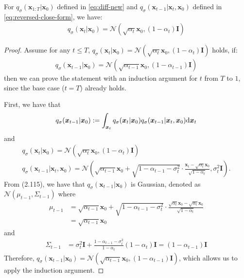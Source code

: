 \begin{lemma}
\label{lemma:reverse-process-consistency}
For $q_\sigma(\bm{x}_{1:T} | \bm{x}_0)$ defined in \eqref{eq:diff-new} and $q_\sigma(\bm{x}_{t-1} | \bm{x}_t, \bm{x}_0)$ defined in \eqref{eq:reversed-close-form}, we have:
\begin{align}
q_\sigma(\bm{x}_{t} | \bm{x}_0) = \mathcal{N}(\sqrt{\alpha_t} \bm{x}_0, (1 - \alpha_t) \bm{I})
\end{align}
\end{lemma}
\begin{proof}
Assume for any $t \leq T$, $q_\sigma(\bm{x}_{t} | \bm{x}_0) = \mathcal{N}(\sqrt{\alpha_t} \bm{x}_0, (1 - \alpha_t) \bm{I})$ holds, if:
\begin{align}
    q_\sigma(\bm{x}_{t-1} | \bm{x}_0) = \mathcal{N}(\sqrt{\alpha_{t-1}} \bm{x}_0, (1 - \alpha_{t-1}) \bm{I})
\end{align}
then we can prove the statement with an induction argument for $t$ from $T$ to $1$, since the base case ($t = T$) already holds.

First, we have that
$$
    q_\sigma(\bm{x}_{t-1} | \bm{x}_0) := \int_{\bm{x}_t} q_\sigma(\bm{x}_{t} | \bm{x}_0) q_\sigma(\bm{x}_{t-1} | \bm{x}_t, \bm{x}_0) \mathrm{d} \bm{x}_t
$$
and
\begin{gather}
   q_\sigma(\bm{x}_{t} | \bm{x}_0) = \mathcal{N}(\sqrt{\alpha_t} \bm{x}_0, (1 - \alpha_t) \bm{I}) \\
   q_\sigma(\bm{x}_{t-1} | \bm{x}_t, \bm{x}_0) = \mathcal{N}\left(\sqrt{\alpha_{t-1}} \bm{x}_{0} + \sqrt{1 - \alpha_{t-1} - \sigma^2_t} \cdot {\frac{\bm{x}_{t}  - \sqrt{\alpha_{t}} \bm{x}_0}{\sqrt{1 - \alpha_{t}}}}, \sigma_t^2 \bm{I} \right).
\end{gather}
From \citet{bishop2006pattern} (2.115), we have that $q_\sigma(\bm{x}_{t-1} | \bm{x}_0)$ is Gaussian, denoted as $\mathcal{N}(\mu_{t-1}, \Sigma_{t-1})$ where
\begin{align}
    \mu_{t-1} & = \sqrt{\alpha_{t-1}} \bm{x}_{0} + \sqrt{1 - \alpha_{t-1} - \sigma^2_t} \cdot {\frac{\sqrt{\alpha_t} \bm{x}_0  - \sqrt{\alpha_{t}} \bm{x}_0}{\sqrt{1 - \alpha_{t}}}} \\
    & = \sqrt{\alpha_{t-1}} \bm{x}_{0}
\end{align}
and
\begin{align}
    \Sigma_{t-1} & = \sigma_t^2 \bm{I} + \frac{1 - \alpha_{t-1} - \sigma^2_t}{1 - \alpha_t} (1 - \alpha_t) \bm{I} = (1 - \alpha_{t-1}) \bm{I}
\end{align}
Therefore, $q_\sigma(\bm{x}_{t-1} | \bm{x}_0) = \mathcal{N}(\sqrt{\alpha_{t-1}} \bm{x}_0, (1 - \alpha_{t-1}) \bm{I})$, which allows us to apply the induction argument.
\end{proof}


